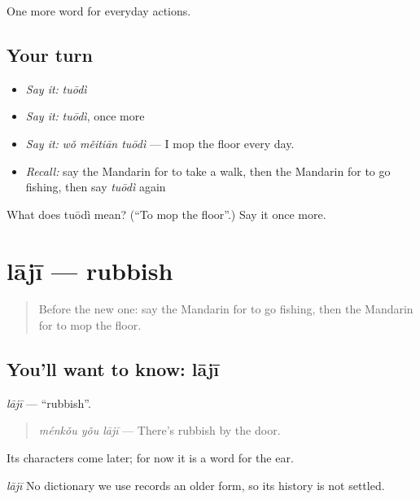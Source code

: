 \begin{grammarlens}[title={What you've built}]
One more word for everyday actions.
\end{grammarlens}

\subsection*{Your turn}
\begin{itemize}
\raggedright
  \item \emph{Say it:} \emph{tuōdì}
  \item \emph{Say it:} \emph{tuōdì}, once more
  \item \emph{Say it:} \emph{wǒ měitiān tuōdì} — I mop the floor every day.
  \item \emph{Recall:} say the Mandarin for to take a walk, then the Mandarin for to go fishing, then say \emph{tuōdì} again
\end{itemize}

\begin{tcolorbox}[breakable,colback=teal!4,colframe=teal!35!black,title={Before you move on}]
What does tuōdì mean? (\textquotedblleft{}To mop the floor\textquotedblright{}.) Say it once more.
\end{tcolorbox}
\section[lājī]{lājī — rubbish}

\label{lesson:ZH-C142-laji}



\begin{quote}
Before the new one: say the Mandarin for to go fishing, then the Mandarin for to mop the floor.
\end{quote}

\subsection*{You'll want to know: lājī}
\emph{lājī} — \textquotedblleft{}rubbish\textquotedblright{}.

\begin{quote}
\emph{ménkǒu yǒu lājī} — There's rubbish by the door.
\end{quote}

Its characters come later; for now it is a word for the ear.

\begin{cousinweb}
\emph{lājī} No dictionary we use records an older form, so its history is not settled.
\end{cousinweb}

